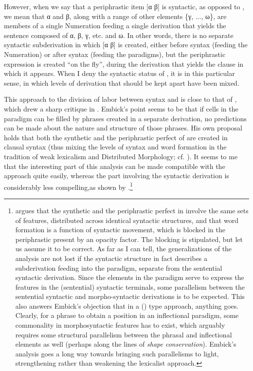 \documentclass[output=paper]{LSP/langsci}
\begin{document}
However, when we say that a periphrastic item [α β] is syntactic, as opposed to , we mean that α and β, along with a range of other elements \{γ, ..., ω\}, are members of a single Numeration feeding a single derivation that yields the sentence composed of α, β, γ, etc. and ω. In other words, there is no separate syntactic subderivation in which [α β] is created, either before syntax (feeding the Numeration) or after syntax (feeding the  paradigms), but the periphrastic expression is created ``on the fly'', during the derivation that yields the clause in which it appears. When I deny the syntactic status of , it is in this particular sense, in which levels of derivation that should be kept apart have been mixed.

This approach to the division of labor between syntax and  is close to that of \citet{BörjarsEtAl1997}, which drew a sharp critique in \citet[223--224]{Embick2000}. Embick’s point seems to be that if cells in the  paradigm can be filled by phrases created in a separate derivation, no predictions can be made about the nature and structure of those phrases. His own proposal holds that both the synthetic and the periphrastic perfect of  are created in clausal syntax (thus mixing the levels of syntax and word formation in the tradition of weak lexicalism and Distributed Morphology; cf. \citealt{HalleMarantz1993,Halle1997}). It seems to me that the interesting part of this analysis can be made compatible with the \citeauthor{BörjarsEtAl1997} approach quite easily, whereas the part involving the syntactic derivation is considerably less compelling,\largerpage as shown by \citet[129f]{Kiparsky2005}.\footnote{\citet{Embick2000} argues that the synthetic and the periphrastic perfect in  involve the same sets of features, distributed across identical syntactic structures, and that word formation is a function of syntactic movement, which is blocked in the periphrastic present by an opacity factor. The blocking is stipulated, but let us assume it to be correct. As far as I can tell, the generalizations of the analysis are not lost if the syntactic structure in fact describes a subderivation feeding into the  paradigm, separate from the sentential syntactic derivation. Since the elements in the  paradigm serve to express the features in the (sentential) syntactic terminals, some parallelism between the sentential syntactic and morpho-syntactic derivations is to be expected.  This also answers Embick’s objection that in a \citeauthor{BörjarsEtAl1997} (\citeyear{BörjarsEtAl1997}) type approach, anything goes. Clearly, for a phrase to obtain a position in an inflectional paradigm, some commonality in morphosyntactic features has to exist, which arguably requires some structural parallelism between the phrasal and inflectional elements as well (perhaps along the lines of  \textit{shape conservation}). Embick’s analysis goes a long way towards bringing such parallelisms to light, strengthening rather than weakening the lexicalist approach.}
\end{document}
